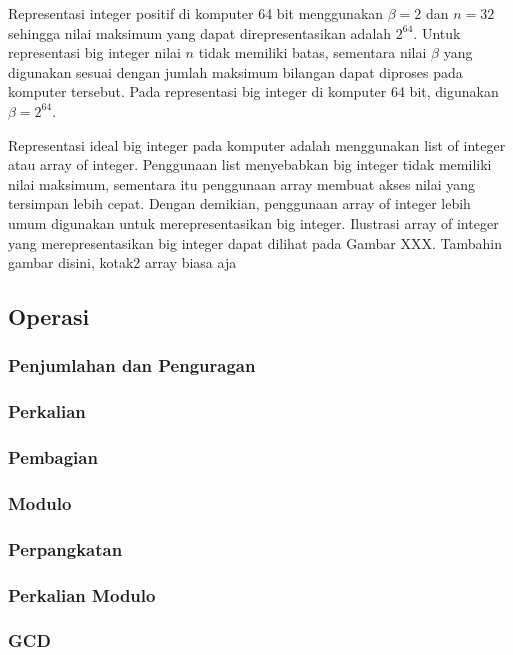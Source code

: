 Representasi integer positif di komputer 64 bit menggunakan $\beta = 2$ dan $n = 32$ sehingga nilai maksimum yang dapat direpresentasikan adalah $2^{64}$. Untuk representasi big integer nilai $n$ tidak memiliki batas, sementara nilai $\beta$ yang digunakan sesuai dengan jumlah maksimum bilangan dapat diproses pada komputer tersebut. Pada representasi big integer di komputer 64 bit, digunakan $\beta = 2^{64}$.

Representasi ideal big integer pada komputer adalah menggunakan list of integer atau array of integer. Penggunaan list menyebabkan big integer tidak memiliki nilai maksimum, sementara itu penggunaan array membuat akses nilai yang tersimpan lebih cepat. Dengan demikian, penggunaan array of integer lebih umum digunakan untuk merepresentasikan big integer. Ilustrasi array of integer yang merepresentasikan big integer dapat dilihat pada Gambar XXX. 
\colorbox{BurntOrange}{Tambahin gambar disini, kotak2 array biasa aja}
\subsection{Operasi}
\subsubsection{Penjumlahan dan Penguragan}
\subsubsection{Perkalian}
\subsubsection{Pembagian}
\subsubsection{Modulo}
\subsubsection{Perpangkatan}
\subsubsection{Perkalian Modulo}
\subsubsection{GCD}
